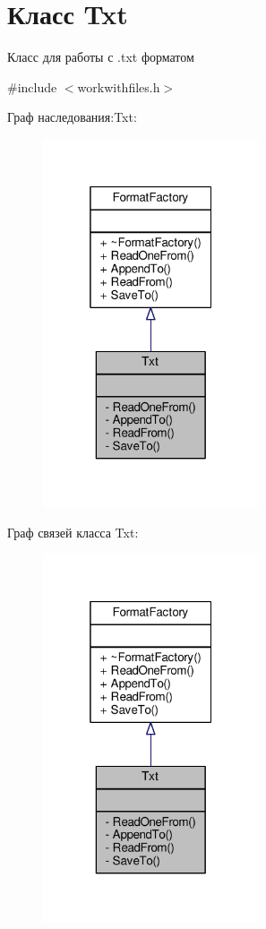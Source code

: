 \hypertarget{class_txt}{}\section{Класс Txt}
\label{class_txt}


Класс для работы с .txt форматом  




{\ttfamily \#include $<$workwithfiles.\+h$>$}



Граф наследования\+:Txt\+:\nopagebreak
\begin{figure}[H]
\begin{center}
\leavevmode
\includegraphics[width=181pt]{class_txt__inherit__graph}
\end{center}
\end{figure}


Граф связей класса Txt\+:\nopagebreak
\begin{figure}[H]
\begin{center}
\leavevmode
\includegraphics[width=181pt]{class_txt__coll__graph}
\end{center}
\end{figure}
